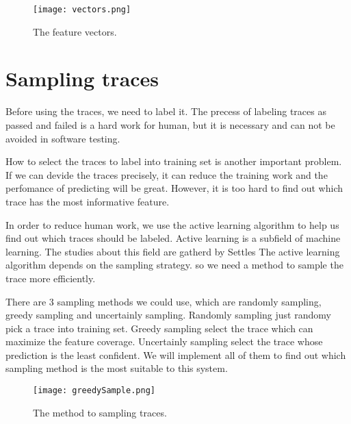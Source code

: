 \begin{figure}[ht]
	\graphicspath{{pic/}}
	\begin{center}
		\texttt{[image: vectors.png]}
	\end{center}
	\caption{ The feature vectors. }
	\label{featureVectors}
\end{figure}


\clearpage

\section{Sampling traces}

Before using the traces, we need to label it.
The precess of labeling traces as passed and failed is a hard work for human,
but it is necessary and can not be avoided in software testing.

How to select the traces to label into training set is another important problem.
If we can devide the traces precisely,
it can reduce the training work and the perfomance of predicting will be great.
However, it is too hard to find out which trace has the most informative feature.

In order to reduce human work,
we use the active learning algorithm to help us find out which traces should be labeled.
Active learning is a subfield of machine learning.
The studies about this field are gatherd by Settles\cite{ActiveLearning}
The active learning algorithm depends on the sampling strategy.
so we need a method to sample the trace more efficiently.

There are 3 sampling methods we could use, which are randomly sampling, greedy sampling and uncertainly sampling.
Randomly sampling just randomy pick a trace into training set.
Greedy sampling select the trace which can maximize the feature coverage.
Uncertainly sampling  select the trace whose prediction is the least confident.
We will implement all of them to find out which sampling method is the most suitable to this system.


\begin{figure}[ht]
	\graphicspath{{pic/}}
	\begin{center}
		\texttt{[image: greedySample.png]}
	\end{center}
	\caption{ The method to sampling traces. }
	\label{greedySample}
\end{figure}


